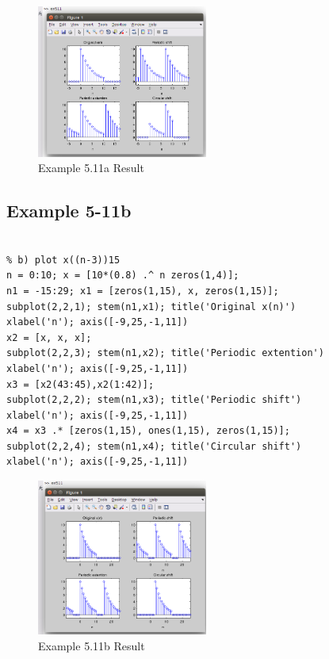 \documentclass[11pt
  , a4paper
  , article
  , oneside
]{memoir}
\begin{document}
\clearpage
\begin{figure}[h!]
	\centering
	\includegraphics[width=0.5\textwidth,height=0.3\textwidth]{./images/ex511.png}
	\caption{Example 5.11a Result}
	\label{fig:Example 5.11a Result}
\end{figure}


\subsection{Example 5-11b}
\begin{lstlisting}[style=termstyle]
% Example 5-11b

% b) plot x((n-3))15
n = 0:10; x = [10*(0.8) .^ n zeros(1,4)];
n1 = -15:29; x1 = [zeros(1,15), x, zeros(1,15)];
subplot(2,2,1); stem(n1,x1); title('Original x(n)')
xlabel('n'); axis([-9,25,-1,11])
x2 = [x, x, x];
subplot(2,2,3); stem(n1,x2); title('Periodic extention')
xlabel('n'); axis([-9,25,-1,11])
x3 = [x2(43:45),x2(1:42)];
subplot(2,2,2); stem(n1,x3); title('Periodic shift')
xlabel('n'); axis([-9,25,-1,11])
x4 = x3 .* [zeros(1,15), ones(1,15), zeros(1,15)];
subplot(2,2,4); stem(n1,x4); title('Circular shift')
xlabel('n'); axis([-9,25,-1,11])

\end{lstlisting}

\begin{figure}[h!]
	\centering
	\includegraphics[width=0.5\textwidth,height=0.3\textwidth]{./images/ex511b.png}
	\caption{Example 5.11b Result}
	\label{fig:Example 5.11b Result}
\end{figure}

\clearpage
\end{document}
